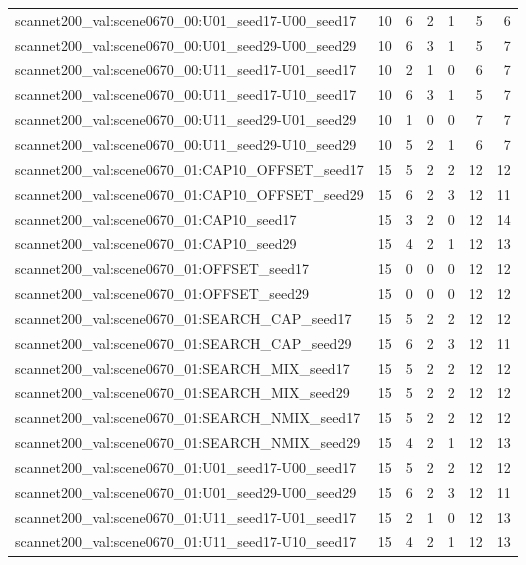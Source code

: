 \begin{table}[t]
\begin{tabular}{lrrrrrr}
scannet200\_val:scene0670\_00:U01\_seed17-U00\_seed17 & 10 & 6 & 2 & 1 & 5 & 6 \\
scannet200\_val:scene0670\_00:U01\_seed29-U00\_seed29 & 10 & 6 & 3 & 1 & 5 & 7 \\
scannet200\_val:scene0670\_00:U11\_seed17-U01\_seed17 & 10 & 2 & 1 & 0 & 6 & 7 \\
scannet200\_val:scene0670\_00:U11\_seed17-U10\_seed17 & 10 & 6 & 3 & 1 & 5 & 7 \\
scannet200\_val:scene0670\_00:U11\_seed29-U01\_seed29 & 10 & 1 & 0 & 0 & 7 & 7 \\
scannet200\_val:scene0670\_00:U11\_seed29-U10\_seed29 & 10 & 5 & 2 & 1 & 6 & 7 \\
scannet200\_val:scene0670\_01:CAP10\_OFFSET\_seed17 & 15 & 5 & 2 & 2 & 12 & 12 \\
scannet200\_val:scene0670\_01:CAP10\_OFFSET\_seed29 & 15 & 6 & 2 & 3 & 12 & 11 \\
scannet200\_val:scene0670\_01:CAP10\_seed17 & 15 & 3 & 2 & 0 & 12 & 14 \\
scannet200\_val:scene0670\_01:CAP10\_seed29 & 15 & 4 & 2 & 1 & 12 & 13 \\
scannet200\_val:scene0670\_01:OFFSET\_seed17 & 15 & 0 & 0 & 0 & 12 & 12 \\
scannet200\_val:scene0670\_01:OFFSET\_seed29 & 15 & 0 & 0 & 0 & 12 & 12 \\
scannet200\_val:scene0670\_01:SEARCH\_CAP\_seed17 & 15 & 5 & 2 & 2 & 12 & 12 \\
scannet200\_val:scene0670\_01:SEARCH\_CAP\_seed29 & 15 & 6 & 2 & 3 & 12 & 11 \\
scannet200\_val:scene0670\_01:SEARCH\_MIX\_seed17 & 15 & 5 & 2 & 2 & 12 & 12 \\
scannet200\_val:scene0670\_01:SEARCH\_MIX\_seed29 & 15 & 5 & 2 & 2 & 12 & 12 \\
scannet200\_val:scene0670\_01:SEARCH\_NMIX\_seed17 & 15 & 5 & 2 & 2 & 12 & 12 \\
scannet200\_val:scene0670\_01:SEARCH\_NMIX\_seed29 & 15 & 4 & 2 & 1 & 12 & 13 \\
scannet200\_val:scene0670\_01:U01\_seed17-U00\_seed17 & 15 & 5 & 2 & 2 & 12 & 12 \\
scannet200\_val:scene0670\_01:U01\_seed29-U00\_seed29 & 15 & 6 & 2 & 3 & 12 & 11 \\
scannet200\_val:scene0670\_01:U11\_seed17-U01\_seed17 & 15 & 2 & 1 & 0 & 12 & 13 \\
scannet200\_val:scene0670\_01:U11\_seed17-U10\_seed17 & 15 & 4 & 2 & 1 & 12 & 13 \\

\end{tabular}
\end{table}
